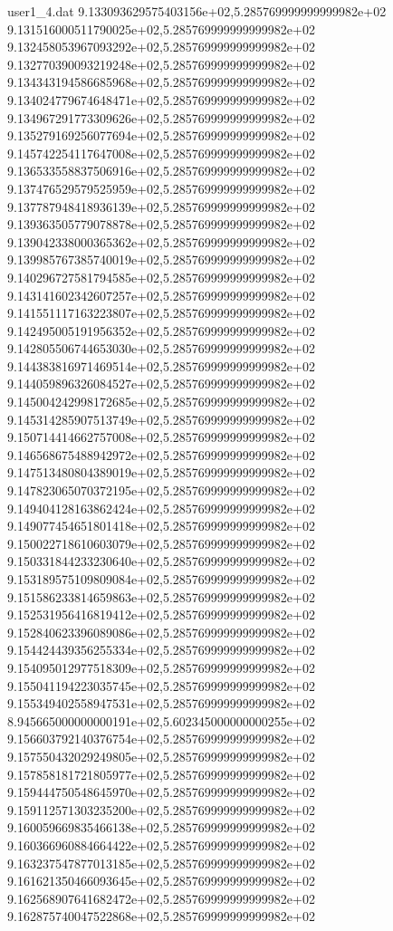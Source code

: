 \begin{filecontents}{user1_4.dat}
9.133093629575403156e+02,5.285769999999999982e+02
9.131516000511790025e+02,5.285769999999999982e+02
9.132458053967093292e+02,5.285769999999999982e+02
9.132770390093219248e+02,5.285769999999999982e+02
9.134343194586685968e+02,5.285769999999999982e+02
9.134024779674648471e+02,5.285769999999999982e+02
9.134967291773309626e+02,5.285769999999999982e+02
9.135279169256077694e+02,5.285769999999999982e+02
9.145742254117647008e+02,5.285769999999999982e+02
9.136533558837506916e+02,5.285769999999999982e+02
9.137476529579525959e+02,5.285769999999999982e+02
9.137787948418936139e+02,5.285769999999999982e+02
9.139363505779078878e+02,5.285769999999999982e+02
9.139042338000365362e+02,5.285769999999999982e+02
9.139985767385740019e+02,5.285769999999999982e+02
9.140296727581794585e+02,5.285769999999999982e+02
9.143141602342607257e+02,5.285769999999999982e+02
9.141551117163223807e+02,5.285769999999999982e+02
9.142495005191956352e+02,5.285769999999999982e+02
9.142805506744653030e+02,5.285769999999999982e+02
9.144383816971469514e+02,5.285769999999999982e+02
9.144059896326084527e+02,5.285769999999999982e+02
9.145004242998172685e+02,5.285769999999999982e+02
9.145314285907513749e+02,5.285769999999999982e+02
9.150714414662757008e+02,5.285769999999999982e+02
9.146568675488942972e+02,5.285769999999999982e+02
9.147513480804389019e+02,5.285769999999999982e+02
9.147823065070372195e+02,5.285769999999999982e+02
9.149404128163862424e+02,5.285769999999999982e+02
9.149077454651801418e+02,5.285769999999999982e+02
9.150022718610603079e+02,5.285769999999999982e+02
9.150331844233230640e+02,5.285769999999999982e+02
9.153189575109809084e+02,5.285769999999999982e+02
9.151586233814659863e+02,5.285769999999999982e+02
9.152531956416819412e+02,5.285769999999999982e+02
9.152840623396089086e+02,5.285769999999999982e+02
9.154424439356255334e+02,5.285769999999999982e+02
9.154095012977518309e+02,5.285769999999999982e+02
9.155041194223035745e+02,5.285769999999999982e+02
9.155349402558947531e+02,5.285769999999999982e+02
8.945665000000000191e+02,5.602345000000000255e+02
9.156603792140376754e+02,5.285769999999999982e+02
9.157550432029249805e+02,5.285769999999999982e+02
9.157858181721805977e+02,5.285769999999999982e+02
9.159444750548645970e+02,5.285769999999999982e+02
9.159112571303235200e+02,5.285769999999999982e+02
9.160059669835466138e+02,5.285769999999999982e+02
9.160366960884664422e+02,5.285769999999999982e+02
9.163237547877013185e+02,5.285769999999999982e+02
9.161621350466093645e+02,5.285769999999999982e+02
9.162568907641682472e+02,5.285769999999999982e+02
9.162875740047522868e+02,5.285769999999999982e+02

\end{filecontents}
